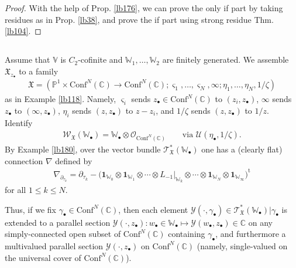 \documentclass[12pt,a4paper,notitlepage]{article}
\theoremstyle{definition}
\theoremstyle{plain}
\newcommand{\fk}{\mathfrak}
\newcommand{\mc}{\mathcal}
\newcommand{\tr}{\mathrm{t}} %
\newcommand{\id}{\mathbf{1}}
\newcommand{\Conf}{\mathrm{Conf}}
\newcommand{\scr}{\mathscr}
\newcommand{\sgm}{\varsigma}
\newcommand{\blt}{\bullet}
\newcommand{\Vbb}{\mathbb V}
\newcommand{\Wbb}{\mathbb W}
\newcommand{\Cbb}{\mathbb C}
\newcommand{\Pbb}{\mathbb P}
\numberwithin{equation}{section}
\begin{document}
\begin{proof}
With the help of Prop. \ref{lb176}, we can prove the only if part by taking residues as in Prop. \ref{lb38}, and prove the if part using strong residue Thm. \ref{lb104}.
\end{proof}



\subsection{}


Assume that $\Vbb$ is $C_2$-cofinite and $\Wbb_1,\dots,\Wbb_2$ are finitely generated. We assemble $\fk X_{z_\blt}$ to a family
\begin{align}
\fk X=(\Pbb^1\times\Conf^N(\Cbb)\rightarrow\Conf^N(\Cbb);\sgm_1,\dots,\sgm_N,\infty;\eta_1,\dots,\eta_N,1/\zeta)
\end{align}
as in Example \ref{lb118}. Namely, $\sgm_i$ sends $z_\blt\in\Conf^N(\Cbb)$ to $(z_i,z_\blt)$, $\infty$ sends $z_\blt$ to $(\infty,z_\blt)$, $\eta_i$ sends $(z,z_\blt)$ to $z-z_i$, and $1/\zeta$ sends $(z,z_\blt)$ to $1/z$. Identify
\begin{align*}
\scr W_{\fk X}(\Wbb_\blt)=\Wbb_\blt\otimes\scr O_{\Conf^N(\Cbb)}\qquad\text{via }\mc U(\eta_\blt,1/\zeta).
\end{align*}
By Example \ref{lb180}, over the vector bundle $\scr T_{\fk X}^*(\Wbb_\blt)$ one has a (clearly flat) connection $\nabla$ defined by
\begin{align}
\nabla_{\partial_{\tau_k}}=\partial_{\tau_k}-\big(\id_{\Wbb_0}\otimes\id_{\Wbb_1}\otimes\cdots\otimes L_{-1}\big|_{\Wbb_k}\otimes\cdots\otimes\id_{\Wbb_N}\otimes\id_{\Wbb_\infty}\big)^\tr
\end{align}
for all $1\leq k\leq N$. 

Thus, if we fix $\gamma_\blt\in\Conf^N(\Cbb)$, then each element $\mc Y(\cdot,\gamma_\blt)\in\scr T_{\fk X}^*(\Wbb_\blt)|\gamma_\blt$ is extended to a parallel section $\mc Y(\cdot,z_\blt):w_\blt\in\Wbb_\blt\mapsto \mc Y(w_\blt,z_\blt)\in\Cbb$ on any simply-connected open subset of $\Conf^N(\Cbb)$ containing $\gamma_\blt$, and furthermore a multivalued parallel section $\mc Y(\cdot,z_\blt)$ on $\Conf^N(\Cbb)$ (namely, single-valued on the universal cover of $\Conf^N(\Cbb)$).



\subsection{}
\end{document}
